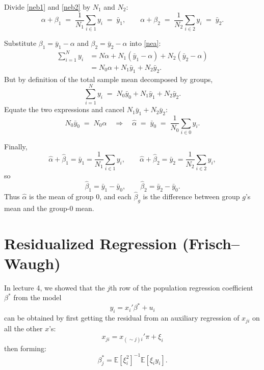 \documentclass[12pt]{article}
\newcommand{\E}{\mathbb{E}}
\numberwithin{equation}{section}
\begin{document}
\begin{enumerate}[label=(\alph*),leftmargin=1.3em]
\begin{enumerate}[label=\roman*.]
            Divide \eqref{neb1} and \eqref{neb2} by $N_1$ and $N_2$:
            \[
            \alpha+\beta_1 \;=\; \frac{1}{N_1}\sum_{i\in 1} y_i \;=\; \bar y_1,
            \qquad
            \alpha+\beta_2 \;=\; \frac{1}{N_2}\sum_{i\in 2} y_i \;=\; \bar y_2.
            \]
            
            Substitute $\beta_1=\bar y_1-\alpha$ and $\beta_2=\bar y_2-\alpha$ into \eqref{nea}:
            \begin{align*}
            \sum_{i=1}^N y_i
            &= N\alpha + N_1(\bar y_1-\alpha) + N_2(\bar y_2-\alpha)  \\
            &= N_0\alpha + N_1\bar y_1 + N_2\bar y_2.
            \end{align*}
            But by definition of the total sample mean decomposed by groups,
            \[
            \sum_{i=1}^N y_i \;=\; N_0\bar y_0 + N_1\bar y_1 + N_2\bar y_2.
            \]
            Equate the two expressions and cancel $N_1\bar y_1 + N_2\bar y_2$:
            \[
            N_0\bar y_0 \;=\; N_0\alpha
            \quad\Longrightarrow\quad
            \hat\alpha \;=\; \bar y_0 \;=\; \frac{1}{N_0}\sum_{i\in 0} y_i.
            \]
            
            Finally,
            \[
            \hat\alpha+\hat\beta_1=\bar y_1=\frac{1}{N_1}\sum_{i\in 1} y_i,
            \qquad
            \hat\alpha+\hat\beta_2=\bar y_2=\frac{1}{N_2}\sum_{i\in 2} y_i,
            \]
            so
            \[
            \hat\beta_1=\bar y_1-\bar y_0,
            \qquad
            \hat\beta_2=\bar y_2-\bar y_0.
            \]
            Thus $\hat\alpha$ is the mean of group 0, and each $\hat\beta_g$ is the difference between group $g$’s mean and the group-0 mean.
    \end{enumerate}
\end{enumerate}

\bigskip

\section{Residualized Regression (Frisch--Waugh)}  %

In lecture 4, we showed that the $j$th row of the population regression coefficient 
$\beta^\ast$ from the model
\[
y_i = x_i'\beta^\ast + u_i
\]
can be obtained by first getting the residual from an auxiliary regression of $x_{ji}$ 
on all the other $x$'s:
\[
x_{ji} = x_{(\sim j)i}' \pi + \xi_i
\]
then forming:
\[
\beta_j^\ast = \E[\xi_i^2]^{-1}\E[\xi_i y_i].
\]
\end{document}
